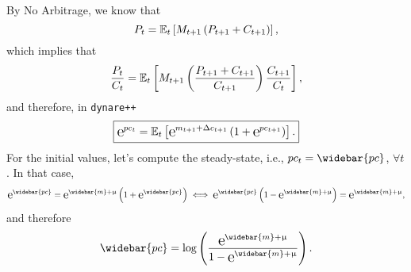 	By No Arbitrage, we know that 
$$
P_t = \mathbb{E}_t\left[M_{t+1}\left(P_{t+1}+C_{t+1}\right)\right],
$$
which implies that
$$
\frac{P_t}{C_t} = \mathbb{E}_t \left[M_{t+1}\left(\frac{P_{t+1}+C_{t+1}}{C_{t+1}}\right)\frac{C_{t+1}}{C_t}\right],
$$
and therefore, in \texttt{dynare++}
\begin{equation}
	\boxed{\e{pc_t} = \E_t\left[\e{m_{t+1}+\Delta c_{t+1}}\left(1+\e{pc_{t+1}}\right)\right].}
\end{equation}
For the initial values, let's compute the steady-state, i.e., $pc_t = \widebar{pc}$, $\forall t$. In that case,
$$
	\e{\widebar{pc}} = \e{\widebar{m}+\mu}\left(1+\e{\widebar{pc}}\right)\iff \e{\widebar{pc}}\left(1-\e{\widebar{m}+\mu}\right) = \e{\widebar{m}+\mu},
$$
and therefore
\begin{equation}
	\widebar{pc} = \log\left(\frac{\e{\widebar{m}+\mu}}{1-\e{\widebar{m}+\mu}}\right).
\end{equation}